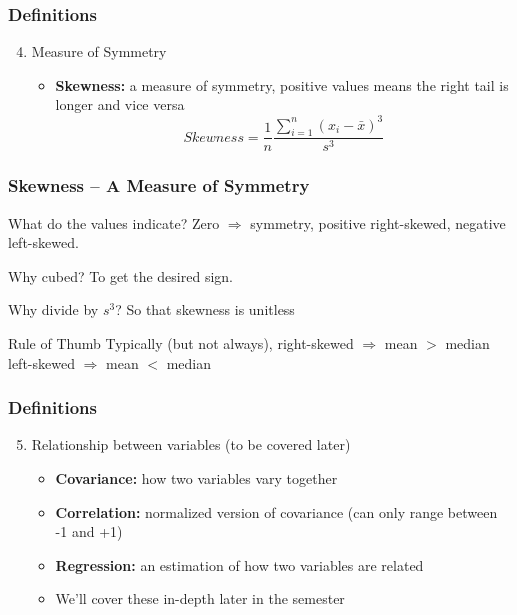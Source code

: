 \documentclass[handout]{beamer}
\begin{document}
\begin{frame}
\frametitle{Definitions}
	\begin{enumerate}
	\setcounter{enumi}{3}
		\item Measure of Symmetry
		\begin{itemize}
			\item \textbf{Skewness:} a measure of symmetry, positive values means the right tail is 				longer and vice versa
			$$
			Skewness = \frac{1}{n}\frac{\sum_{i = 1}^n (x_i - \bar{x})^3}{s^3}
			$$
		\end{itemize}
	\end{enumerate}
\end{frame}

 \begin{frame}
 \frametitle{Skewness -- A Measure of Symmetry}
	 \begin{center}
	 \end{center}
	 \begin{block}{What do the values indicate?}
	 	Zero $\Rightarrow$ symmetry, positive right-skewed, negative left-skewed.
	 \end{block}
	 \begin{block}{Why cubed?}
	 	To get the desired sign.
	 \end{block}
	 \begin{block}{Why divide by $s^3$?}
	 	So that skewness is unitless
	 \end{block}
	 \begin{block}{Rule of Thumb}
	 	Typically (but not always), right-skewed $\Rightarrow$ mean $>$ median
	 	\\ 
	 	left-skewed $\Rightarrow$ mean $<$ median
	 \end{block}
 \end{frame}

\begin{frame}
\frametitle{Definitions}
	\begin{enumerate}
	\setcounter{enumi}{4}
		\item Relationship between variables (to be covered later)
		\begin{itemize}
			\item \textbf{Covariance:} how two variables vary together
			\item \textbf{Correlation:} normalized version of covariance (can only range between -1 			and +1)
			\item \textbf{Regression:} an estimation of how two variables are related
			\item \alert{We'll cover these in-depth later in the semester}
		\end{itemize}
	\end{enumerate}
\end{frame}
\end{document}
